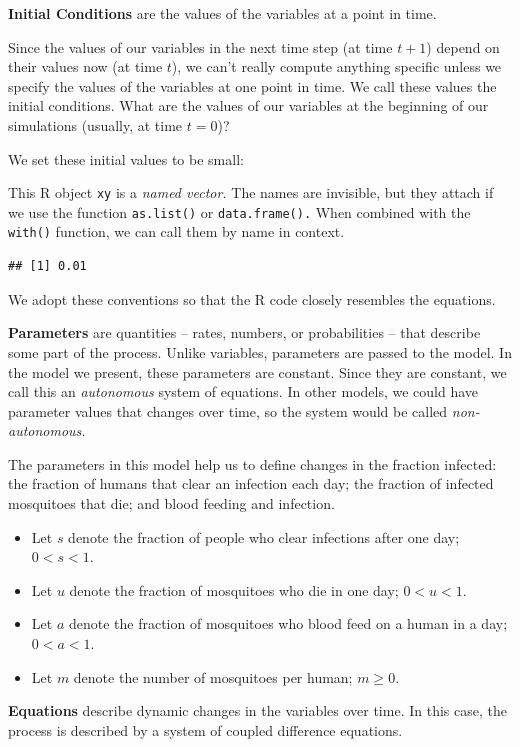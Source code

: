 \documentclass[
]{book}
\begin{document}
\textbf{Initial Conditions} are the values of the variables at a point in time.

Since the values of our variables in the next time step (at time \(t+1\)) depend on their values now (at time \(t\)), we can't really compute anything specific unless we specify the values of the variables at one point in time. We call these values the initial conditions. What are the values of our variables at the beginning of our simulations (usually, at time \(t=0\))?

We set these initial values to be small:

This R object \texttt{xy} is a \emph{named vector.} The names are invisible, but they attach if we use the function \texttt{as.list()} or \texttt{data.frame().} When combined with the \texttt{with()} function, we can call them by name in context.

\begin{verbatim}
## [1] 0.01
\end{verbatim}

We adopt these conventions so that the R code closely resembles the equations.

\textbf{Parameters} are quantities -- rates, numbers, or probabilities -- that describe some part of the process. Unlike variables, parameters are passed to the model. In the model we present, these parameters are constant. Since they are constant, we call this an \emph{autonomous} system of equations. In other models, we could have parameter values that changes over time, so the system would be called \emph{non-autonomous.}

The parameters in this model help us to define changes in the fraction infected: the fraction of humans that clear an infection each day; the fraction of infected mosquitoes that die; and blood feeding and infection.

\begin{itemize}
\item
  Let \(s\) denote the fraction of people who clear infections after one day; \(0 < s < 1.\)
\item
  Let \(u\) denote the fraction of mosquitoes who die in one day; \(0 < u < 1.\)
\item
  Let \(a\) denote the fraction of mosquitoes who blood feed on a human in a day; \(0 < a < 1.\)
\item
  Let \(m\) denote the number of mosquitoes per human; \(m \geq 0.\)
\end{itemize}

\textbf{Equations} describe dynamic changes in the variables over time. In this case, the process is described by a system of coupled difference equations.
\end{document}
